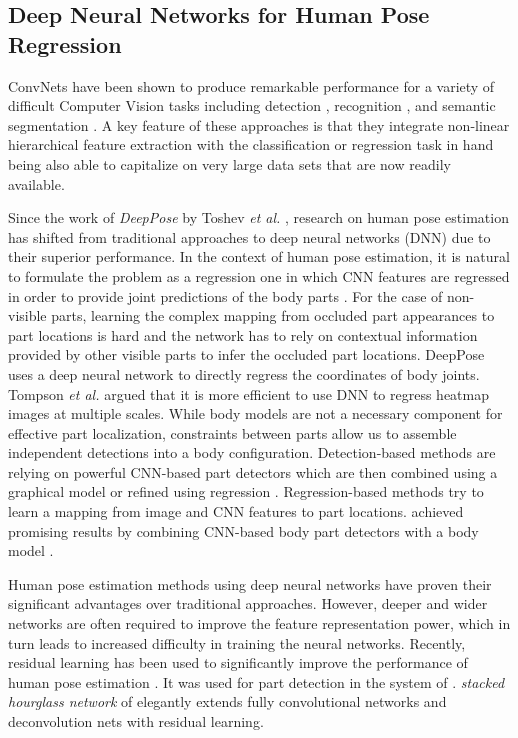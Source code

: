 \documentclass[journal ]{IEEEtran}
\begin{document}
\subsection{Deep Neural Networks for Human Pose Regression}
ConvNets have been shown to produce remarkable performance for a variety of difficult
Computer Vision tasks including detection \cite{ren2015faster, redmon2016you}, recognition \cite{he2016deep, simonyan2014very}, and semantic segmentation \cite{shelhamer2017fully}.
A key feature of these approaches is that they integrate non-linear hierarchical feature extraction with the classification or regression task in hand being also able to capitalize on
very large data sets that are now readily available.

Since the work of \textit{DeepPose} by Toshev {\it et al.} \cite{toshev2014deeppose}, research on human pose estimation has shifted from traditional approaches to deep neural networks (DNN) due to their superior performance. 
In the context of human pose estimation, it is natural to formulate the problem as a regression one in which CNN features are regressed in order to provide joint predictions of the body parts \cite{toshev2014deeppose, pfister2015flowing, belagiannis2015robust}. For the case of non-visible parts, learning the complex mapping from occluded part appearances to part locations is hard and the network has to rely on contextual information provided by other visible parts to infer the occluded part locations.
DeepPose uses a deep neural network to directly regress the coordinates of body joints. Tompson {\it et al.} \cite{tompson2014joint} argued that it is more efficient to use DNN to regress heatmap images at multiple scales.
While body models are not a necessary component for effective part localization, constraints between parts allow us to assemble independent detections into a body configuration. 
Detection-based methods are relying on powerful CNN-based part detectors which are then combined
using a graphical model \cite{chen2014articulated, tompson2014joint} or refined using regression \cite{tompson2015efficient, pishchulin2016deepcut}. Regression-based methods try to learn a mapping from image and CNN features to part locations. 
\cite{chen2014articulated} achieved promising results by combining CNN-based body part detectors with a body model \cite{yang2013articulated}. 

Human pose estimation methods using deep neural networks have proven their significant advantages over traditional approaches.
However, deeper and wider networks are often required to improve the feature representation power, which in turn leads to increased difficulty in training the neural networks.
Recently, residual learning \cite{he2016deep} has been used to significantly improve the performance of human pose estimation \cite{insafutdinov2016deepercut, newell2016stacked}.
It was used for part detection in the system of \cite{insafutdinov2016deepercut}. \textit{stacked hourglass network} of \cite{newell2016stacked} elegantly extends fully convolutional networks \cite{long2015fully} and deconvolution nets \cite{zeiler2011adaptive} with residual learning.
\end{document}
